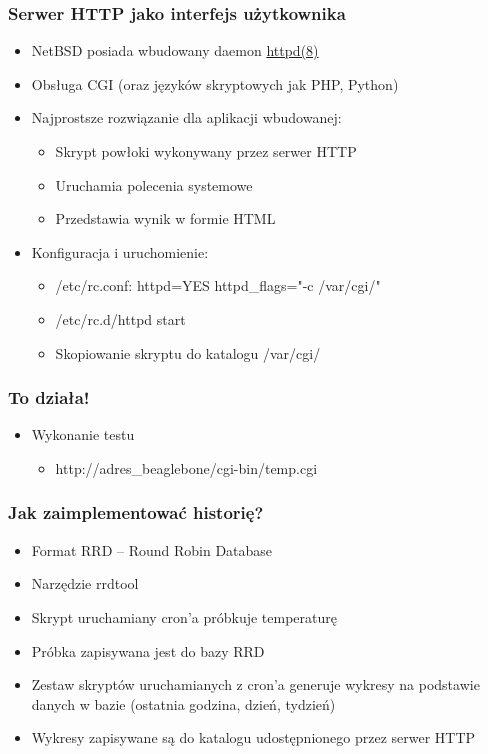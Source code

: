 \documentclass[dvipsnames,table]{beamer}
\begin{document}

\begin{frame}[fragile]
\frametitle{Serwer HTTP jako interfejs użytkownika}
\begin{itemize}
	\item NetBSD posiada wbudowany daemon \href{http://netbsd.gw.com/cgi-bin/man-cgi?httpd++NetBSD-current}{httpd(8)}
	\item Obsługa CGI (oraz języków skryptowych jak PHP, Python)	
	\item Najprostsze rozwiązanie dla aplikacji wbudowanej:
	\begin{itemize}
		\item Skrypt powłoki wykonywany przez serwer HTTP
		\item Uruchamia polecenia systemowe
		\item Przedstawia wynik w formie HTML
	\end{itemize}
	\item Konfiguracja i uruchomienie:
	\begin{itemize}
		\item /etc/rc.conf: httpd=YES httpd\_flags="-c /var/cgi/"
		\item /etc/rc.d/httpd start
		\item Skopiowanie skryptu do katalogu /var/cgi/
	\end{itemize}

\end{itemize}
\lstCGI
\end{frame}

\begin{frame}
\frametitle{To działa!}
\begin{itemize}
	\item Wykonanie testu
	\begin{itemize}
		\item http://adres\_beaglebone/cgi-bin/temp.cgi
	\end{itemize}
\end{itemize}
\end{frame}

\begin{frame}
\frametitle{Jak zaimplementować historię?}
\begin{itemize}
	\item Format RRD -- Round Robin Database
	\item Narzędzie rrdtool
	\item Skrypt uruchamiany cron'a próbkuje temperaturę
	\item Próbka zapisywana jest do bazy RRD
	\item Zestaw skryptów uruchamianych z cron'a generuje wykresy na podstawie danych w bazie (ostatnia godzina, dzień, tydzień)
	\item Wykresy zapisywane są do katalogu udostępnionego przez serwer HTTP

\end{itemize}
\end{frame}
\end{document}
